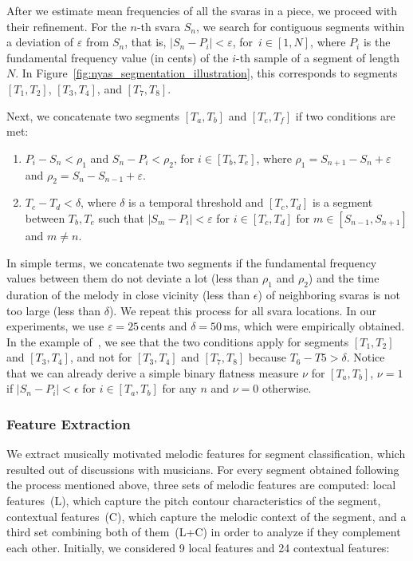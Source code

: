 {After we estimate mean frequencies of all the \glspl{svara} in a piece, we proceed with their refinement. For the $n$-th \gls{svara} $S_n$, we search for contiguous segments within a deviation of $\varepsilon$ from $S_n$, that is, $\vert S_n-P_i \vert < \varepsilon$, for~$i\in[1,N]$, where $P_i$ is the fundamental frequency value (in cents) of the $i$-th sample of a segment of length $N$. In Figure~\ref{fig:nyas_segmentation_illustration}, this corresponds to segments $[T_1,T_2]$, $[T_3,T_4]$, and $[T_7,T_8]$.

Next, we concatenate two segments $[T_a,T_b]$ and $[T_e,T_f]$ if two conditions are met:
\begin{enumerate}
	\item $P_i-S_n < \rho_1$ and $S_n-P_i < \rho_2$, for $i\in[T_b,T_e]$, where $\rho_1 = S_{n+1}-S_n + \varepsilon$ and $\rho_2 = S_n-S_{n-1} + \varepsilon$. 
	\item $T_c-T_d < \delta$, where $\delta$ is a temporal threshold and $[T_c,T_d]$ is a segment between $T_b, T_e$ such that $\vert S_m-P_i\vert <\varepsilon$ for $i\in[T_c,T_d]$ for $m\in [S_{n-1}, S_{n+1}]$ and $m \neq n$.
\end{enumerate}

In simple terms, we concatenate two segments if the fundamental frequency values between them do not deviate a lot (less than $\rho_1$ and $\rho_2$) and the time duration of the melody in close vicinity (less than $\epsilon$) of neighboring \glspl{svara} is not too large (less than $\delta$). We repeat this process for all \gls{svara} locations. In our experiments, we use $\varepsilon = 25$\,cents and $\delta=50$\,ms, which were empirically obtained. In the example of~, we see that the two conditions apply for segments $[T_1,T_2]$ and $[T_3,T_4]$, and not for $[T_3,T_4]$ and $[T_7,T_8]$ because $T_6-T5>\delta$. Notice that we can already derive a simple binary flatness measure $\nu$ for $[T_a, T_b]$, $\nu=1$ if $\vert S_n-P_i \vert< \epsilon$ for $i \in [T_a, T_b]$ for any $n$ and $\nu=0$ otherwise. 

\subsubsection{Feature Extraction}
\label{sec:pro_processing_nyas_segmentation_feature_extraction}

We extract musically motivated melodic features for segment classification, which resulted out of discussions with musicians. For every segment obtained following the process mentioned above, three sets of melodic features are computed: local features~(L), which capture the pitch contour characteristics of the segment, contextual features~(C), which capture the melodic context of the segment, and a third set combining both of them~(L+C) in order to analyze if they complement each other. Initially, we considered 9 local features and 24 contextual features:

}
